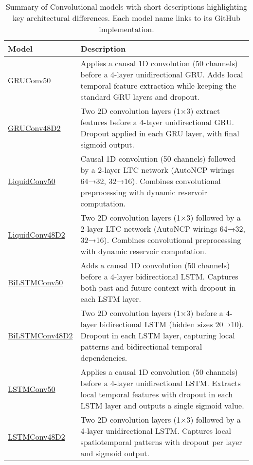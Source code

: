 \begin{table}[h!]
\centering
\renewcommand{\arraystretch}{1.5}
\begin{tabular}{lp{10cm}}
\toprule
\textbf{Model} & \textbf{Description} \\
\midrule
\href{https://github.com/As17-01/brain_signals/blob/main/src/models/GRUConv50.py}{GRUConv50} & Applies a causal 1D convolution (50 channels) before a 4-layer unidirectional GRU. Adds local temporal feature extraction while keeping the standard GRU layers and dropout. \\

\href{https://github.com/As17-01/brain_signals/blob/main/src/models/GRUConv48D2.py}{GRUConv48D2} & Two 2D convolution layers (1×3) extract features before a 4-layer unidirectional GRU. Dropout applied in each GRU layer, with final sigmoid output. \\

\href{https://github.com/As17-01/brain_signals/blob/main/src/models/LiquidConv50.py}{LiquidConv50} & Causal 1D convolution (50 channels) followed by a 2-layer LTC network (AutoNCP wirings 64→32, 32→16). Combines convolutional preprocessing with dynamic reservoir computation. \\

\href{https://github.com/As17-01/brain_signals/blob/main/src/models/LiquidConv48D2.py}{LiquidConv48D2} & Two 2D convolution layers (1×3) followed by a 2-layer LTC network (AutoNCP wirings 64→32, 32→16). Combines convolutional preprocessing with dynamic reservoir computation. \\

\href{https://github.com/As17-01/brain_signals/blob/main/src/models/BiLSTMConv50.py}{BiLSTMConv50} & Adds a causal 1D convolution (50 channels) before a 4-layer bidirectional LSTM. Captures both past and future context with dropout in each LSTM layer. \\

\href{https://github.com/As17-01/brain_signals/blob/main/src/models/BiLSTMConv48D2.py}{BiLSTMConv48D2} & Two 2D convolution layers (1×3) before a 4-layer bidirectional LSTM (hidden sizes 20→10). Dropout in each LSTM layer, capturing local patterns and bidirectional temporal dependencies. \\

\href{https://github.com/As17-01/brain_signals/blob/main/src/models/LSTMConv50.py}{LSTMConv50} & Applies a causal 1D convolution (50 channels) before a 4-layer unidirectional LSTM. Extracts local temporal features with dropout in each LSTM layer and outputs a single sigmoid value. \\

\href{https://github.com/As17-01/brain_signals/blob/main/src/models/LSTMConv48D2.py}{LSTMConv48D2} & Two 2D convolution layers (1×3) followed by a 4-layer unidirectional LSTM. Captures local spatiotemporal patterns with dropout per layer and sigmoid output. \\
\bottomrule
\end{tabular}
\caption{Summary of Convolutional models with short descriptions highlighting key architectural differences. Each model name links to its GitHub implementation.}
\label{tab:model_descriptions}
\end{table}
